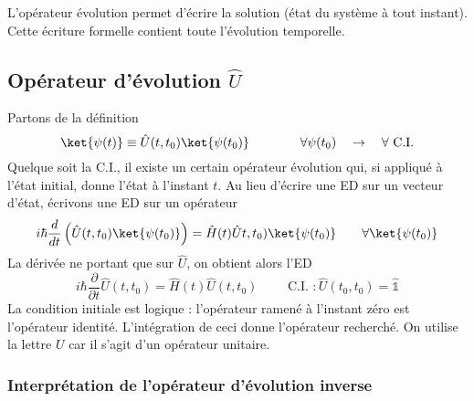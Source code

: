 	L'opérateur évolution  permet d'écrire la solution (état du système à tout instant). Cette 
	écriture formelle contient toute l'évolution temporelle. 

	\subsection{Opérateur d'évolution $\hat{U}$}
	Partons de la définition
	\begin{equation}
	\ket{\psi(t)} \equiv \hat{U}(t,t_0)\ket{\psi(t_0)}\qquad\qquad\forall \psi(t_0)\quad\rightarrow\quad 
	\forall \text{ C.I.}
	\end{equation}
	Quelque soit la C.I., il existe un certain opérateur évolution qui, si appliqué à l'état initial, 
	donne l'état à l'instant $t$. Au lieu d'écrire une ED sur un vecteur d'état, écrivons une ED 
	sur un opérateur
	\begin{equation}
	i\hbar \dfrac{d}{dt}\left(\hat{U}(t,t_0)\ket{\psi(t_0)}\right) = \hat{H}(t)\hat{U}t,t_0)\ket{\psi(t_0)}
	\qquad \forall \ket{\psi(t_0)}
	\end{equation}
	La dérivée ne portant que sur $\hat{U}$, on obtient alors l'ED
	\begin{equation}
	i\hbar \dfrac{\partial}{\partial t}\hat{U}(t,t_0) = \hat{H}(t)\hat{U}(t,t_0)\qquad \text{ C.I. } : 
	\hat{U}(t_0,t_0) = \hat{\mathbb{1}}
	\label{eq:2.62}
	\end{equation}
	La condition initiale est logique : l'opérateur ramené à l'instant zéro est l'opérateur identité.
	L'intégration de ceci donne l'opérateur recherché. On utilise la lettre $U$ car il s'agit d'un 
	opérateur unitaire. 
	
	\subsubsection{Interprétation de l'opérateur d'évolution inverse}	
	
